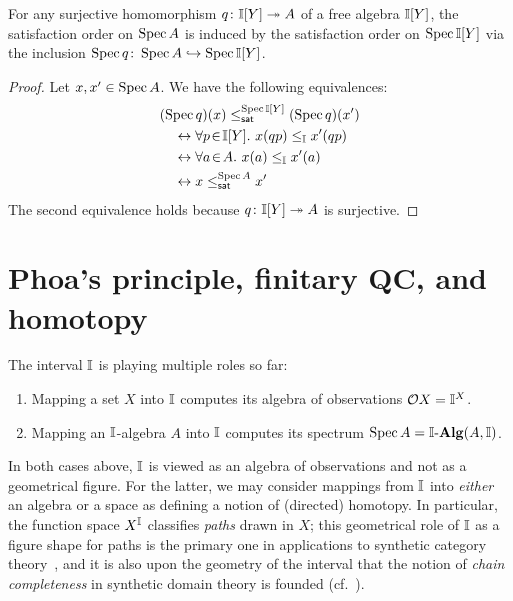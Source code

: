 \begin{lemma}\label{lem:cancoincide}
  For any surjective homomorphism $q \colon \mathbb{I}[Y] \twoheadrightarrow A$ of a free algebra $\mathbb{I}[Y]$, the satisfaction order on $\operatorname{Spec} A$ is induced by the satisfaction order on $\operatorname{Spec}{\mathbb{I}[Y]}$ via the inclusion ${\operatorname{Spec}{q}}\colon\operatorname{Spec}{A}\hookrightarrow \operatorname{Spec}{\mathbb{I}[Y]}$.
\end{lemma} 

\begin{proof}
  Let $x,x' \in \operatorname{Spec} A$. We have the following equivalences:
  \begin{align*}
    &(\spec{q})(x)\satle[\spec{\mbb{I}[Y]}] (\spec{q})(x') \\
    &\quad\eq 
    \fa{p}{\mbb{I}[Y]}
    x(qp) \le_\mbb{I} x'(qp)
    \\ 
    &\quad\eq 
    \fa{a}{A} x(a) \le_\mbb{I} x'(a) 
    \\ 
    &\quad\eq 
    x\satle[\spec{A}] x'
  \end{align*}
% 
  The second equivalence holds because $q\colon \mathbb{I}[Y]\twoheadrightarrow A$ is surjective.
\end{proof}


\section{Phoa's principle, finitary QC, and homotopy}\label{sec:phoaandhomotopy}

The interval $\mathbb{I}$ is playing multiple roles so far:
\begin{enumerate}
  \item Mapping a set $X$ into $\mathbb{I}$ computes its algebra of observations $\mathcal{O}{X} = \mathbb{I}^X$.
  \item Mapping an $\mathbb{I}$-algebra $A$ into $\mathbb{I}$ computes its spectrum $\operatorname{Spec}{A} = \mathbb{I}\text{-}\mathbf{Alg}(A,\mathbb{I})$.
\end{enumerate}

In both cases above, $\mathbb{I}$ is viewed as an algebra of observations and not as a geometrical figure. For the latter, we may consider mappings from $\mathbb{I}$ into \emph{either} an algebra or a space as defining a notion of (directed) homotopy. In particular, the function space $X^{\mathbb{I}}$ classifies \emph{paths} drawn in $X$; this geometrical role of $\mathbb{I}$ as a figure shape for paths is the primary one in applications to synthetic category theory~\citep{riehl2017type}, and it is also upon the geometry of the interval that the notion of \emph{chain completeness} in synthetic domain theory is founded (cf.\ ).

